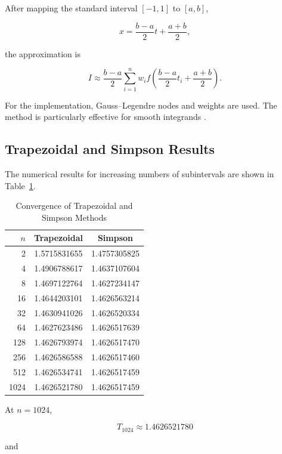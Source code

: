 \documentclass[11pt,a4paper]{article}
\begin{document}
After mapping the standard interval $[-1,1]$ to $[a,b]$,

\[
x=
\frac{b-a}{2}t+
\frac{a+b}{2},
\]

the approximation is

\[
I
\approx
\frac{b-a}{2}
\sum_{i=1}^{n}
w_i
f
\left(
\frac{b-a}{2}t_i+
\frac{a+b}{2}
\right).
\]

For the implementation, Gauss--Legendre nodes and weights are used. The
method is particularly effective for smooth integrands
\cite{press2007,chapra2015}.


\subsection{Trapezoidal and Simpson Results}

The numerical results for increasing numbers of subintervals are shown in
Table~\ref{tab:trap_simpson}.

\begin{table}[H]
\centering
\caption{Convergence of Trapezoidal and Simpson Methods}
\label{tab:trap_simpson}

\begin{tabular}{r|cc}
\toprule
\textbf{$n$}
& \textbf{Trapezoidal}
& \textbf{Simpson} \\
\midrule
2    & 1.5715831655 & 1.4757305825 \\
4    & 1.4906788617 & 1.4637107604 \\
8    & 1.4697122764 & 1.4627234147 \\
16   & 1.4644203101 & 1.4626563214 \\
32   & 1.4630941026 & 1.4626520334 \\
64   & 1.4627623486 & 1.4626517639 \\
128  & 1.4626793974 & 1.4626517470 \\
256  & 1.4626586588 & 1.4626517460 \\
512  & 1.4626534741 & 1.4626517459 \\
1024 & 1.4626521780 & 1.4626517459 \\
\bottomrule
\end{tabular}
\end{table}

At $n=1024$,

\[
T_{1024}
\approx
1.4626521780
\]

and
\end{document}
